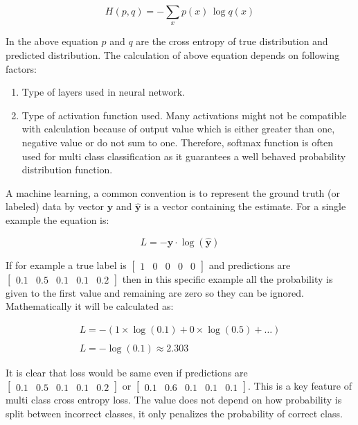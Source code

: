 \documentclass[11pt]{article}
\begin{document}
\begin{equation}
\label{crossent}
{\displaystyle H(p,q)=-\sum _{x}p(x)\,\log q(x)}
\end{equation}

In the above equation $p$ and $q$ are the cross entropy of true distribution and predicted distribution. The calculation of above equation depends on following factors:

\begin{enumerate}
	\item Type of layers used in neural network.
	\item Type of activation function used. Many activations might not be compatible with calculation because of output value which is either greater than one, negative value or do not sum to one. Therefore, softmax function is often used for multi class classification as it guarantees a well behaved probability distribution function.
\end{enumerate}

A machine learning, a common convention is to represent the ground truth (or labeled) data by vector $\mathbf{y}$ and $\mathbf{\hat{y}}$ is a vector containing the estimate. For a single example the equation is:

\begin{equation}
L = - \mathbf{y} \cdot \log(\mathbf{\hat{y}})
\end{equation}

If for example a true label is $\left[\begin{array}{llllll}{1} & {0} & {0} & {0} & {0}\end{array}\right]$ and predictions are $\left[\begin{array}{llllll}{0.1} & {0.5} & {0.1} & {0.1} & {0.2}\end{array}\right]$ then in this specific example all the probability is given to the first value and remaining are zero so they can be ignored. Mathematically it will be calculated as:

$$
\begin{array}{l}{L=-(1 \times \log (0.1)+0 \times \log (0.5)+\ldots)} \\\\ {L=-\log (0.1) \approx 2.303}\end{array}
$$

It is clear that loss would be same even if predictions are $\left[\begin{array}{llllll}{0.1} & {0.5} & {0.1} & {0.1} & {0.2}\end{array}\right]$ or $\left[\begin{array}{llllll}{0.1} & {0.6} & {0.1} & {0.1} & {0.1}\end{array}\right]$. This is a key feature of multi class cross entropy loss. The value does not depend on how probability is split between incorrect classes, it only penalizes the probability of correct class.  
\end{document}
